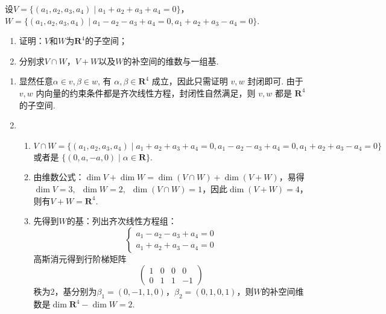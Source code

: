 \begin{exercise}

    \begin{exgroup}
        \item 设$V=\{(a_1,a_2,a_3,a_4) \mid a_1+a_2+a_3+a_4=0\}$，$W=\{(a_1,a_2,a_3,a_4) \mid a_1-a_2-a_3+a_4=0,a_1+a_2+a_3-a_4=0\}$.
        \begin{enumerate}
            \item 证明：$V$和$W$为$\mathbf{R}^4$的子空间；
            \item 分别求$V \cap W$，$V+W$以及$W$的补空间的维数与一组基.
        \end{enumerate}
        \begin{answer}
            \begin{enumerate}
                \item 显然任意$\alpha\in v,\beta \in w$, 有 $\alpha,\beta\in \mathbf{R}^4$ 成立，因此只需证明 $v,w$ 封闭即可. 由于 $v,w$ 内向量的约束条件都是齐次线性方程，封闭性自然满足，则 $v,w$ 都是 $\mathbf{R}^4$ 的子空间.

                \item \begin{enumerate}
                          \item $V\cap W=\{(a_1,a_2,a_3,a_4) \mid a_1+a_2+a_3+a_4=0,a_1-a_2-a_3+a_4=0,a_1+a_2+a_3-a_4=0\}$ 或者是 $\{(0,a,-a,0) \mid \alpha\in \mathbf{R}\}$.

                          \item 由维数公式：$\dim V+\dim W=\dim (V\cap W)+\dim (V+W)$，易得$\dim V=3,\enspace \dim W=2,\enspace \dim (V\cap W)=1$，因此$\dim (V+W)=4$，则有$V+W=\mathbf{R}^4$.

                          \item 先得到$W$的基：列出齐次线性方程组：
                                \[\begin{cases}
                                        a_1-a_2-a_3+a_4=0 \\
                                        a_1+a_2+a_3-a_4=0\end{cases}
                                \]
                                高斯消元得到行阶梯矩阵
                                \[\begin{pmatrix}
                                        1 & 0 & 0 & 0  \\
                                        0 & 1 & 1 & -1
                                    \end{pmatrix}\]
                                秩为2，基分别为$\beta_1= (0,-1,1,0)$，$\beta_2= (0,1,0,1)$，则$W$的补空间维数是$\dim \mathbf{R}^4 - \dim W=2$.


\end{enumerate}
\end{enumerate}
\end{answer}
\end{exgroup}
\end{exercise}
